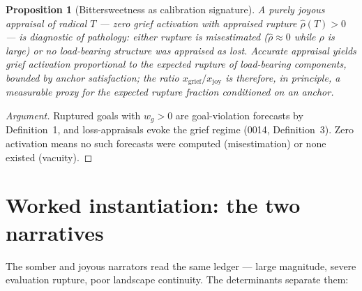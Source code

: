 \documentclass[11pt]{article}
\newtheorem{proposition}{Proposition}
\theoremstyle{definition}
\theoremstyle{remark}
\begin{document}
\begin{proposition}[Bittersweetness as calibration signature]
A \emph{purely} joyous appraisal of radical $T$ --- zero grief activation
with appraised rupture $\hat\rho(T) > 0$ --- is diagnostic of pathology:
either rupture is misestimated ($\hat\rho \approx 0$ while $\rho$ is large)
or no load-bearing structure was appraised as lost. Accurate appraisal yields
grief activation proportional to the expected rupture of load-bearing
components, bounded by anchor satisfaction; the ratio
$x_{\mathrm{grief}} / x_{\mathrm{joy}}$ is therefore, in principle, a
measurable proxy for the expected rupture fraction conditioned on an anchor.
\end{proposition}

\begin{proof}[Argument]
Ruptured goals with $w_g > 0$ are goal-violation forecasts by Definition~1,
and loss-appraisals evoke the grief regime (0014, Definition~3). Zero
activation means no such forecasts were computed (misestimation) or none
existed (vacuity).
\end{proof}

\section{Worked instantiation: the two narratives}

The somber and joyous narrators read the same ledger --- large magnitude,
severe evaluation rupture, poor landscape continuity. The determinants
separate them:
\end{document}
